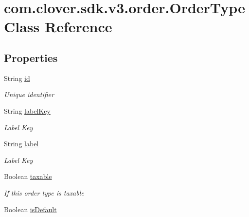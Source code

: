 \hypertarget{classcom_1_1clover_1_1sdk_1_1v3_1_1order_1_1_order_type}{}\section{com.\+clover.\+sdk.\+v3.\+order.\+Order\+Type Class Reference}
\label{classcom_1_1clover_1_1sdk_1_1v3_1_1order_1_1_order_type}
\subsection*{Properties}
\begin{DoxyCompactItemize}
\item 
String \hyperlink{classcom_1_1clover_1_1sdk_1_1v3_1_1order_1_1_order_type_a3602fe9e2b87586662e539d0408c4d09}{id}
\begin{DoxyCompactList}\small\item\em Unique identifier \end{DoxyCompactList}\item 
String \hyperlink{classcom_1_1clover_1_1sdk_1_1v3_1_1order_1_1_order_type_a3236bd3dda0d4d19e4e8e5633139f2f8}{label\+Key}
\begin{DoxyCompactList}\small\item\em Label Key \end{DoxyCompactList}\item 
String \hyperlink{classcom_1_1clover_1_1sdk_1_1v3_1_1order_1_1_order_type_a267e983ec41d865c185114ee4eb25d10}{label}
\begin{DoxyCompactList}\small\item\em Label Key \end{DoxyCompactList}\item 
Boolean \hyperlink{classcom_1_1clover_1_1sdk_1_1v3_1_1order_1_1_order_type_ae54a438e3bdd8b0a7b211a9e022b64f8}{taxable}
\begin{DoxyCompactList}\small\item\em If this order type is taxable \end{DoxyCompactList}\item 
Boolean \hyperlink{classcom_1_1clover_1_1sdk_1_1v3_1_1order_1_1_order_type_a3eb08a6f0cbce7591d852ea9ca07ef2a}{is\+Default}

\end{DoxyCompactItemize}
